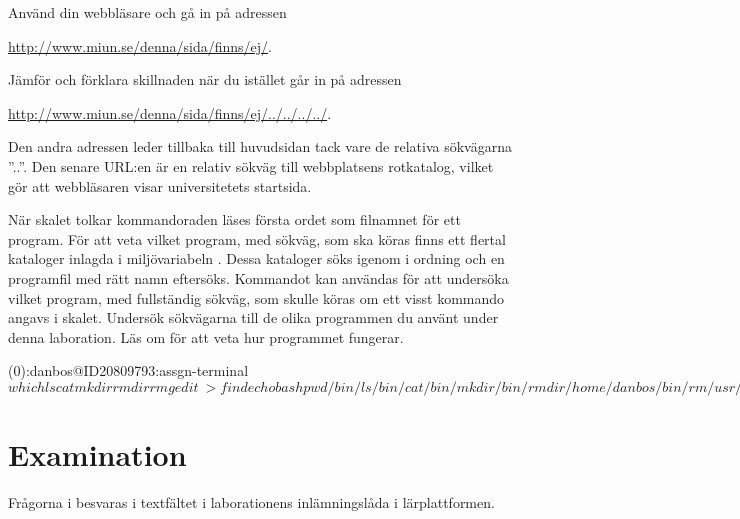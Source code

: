 \documentclass[a4paper,nocourse]{miunasgn}
\begin{document}
\begin{questions}
  \question\label{q:RelativeWWW}
  Använd din webbläsare och gå in på adressen
  \begin{center}
    \url{http://www.miun.se/denna/sida/finns/ej/}.
  \end{center}
  Jämför och förklara skillnaden när du istället går in på adressen
  \begin{center}
    \url{http://www.miun.se/denna/sida/finns/ej/../../../../}.
  \end{center}
  \begin{solution}
    Den andra adressen leder tillbaka till huvudsidan tack vare de relativa
    sökvägarna ''..''.
    Den senare URL:en är en relativ sökväg till webbplatsens rotkatalog, vilket 
    gör att webbläsaren visar universitetets startsida.
  \end{solution}

  \question\label{q:which}
  När skalet tolkar kommandoraden läses första ordet som filnamnet för ett 
  program.
  För att veta vilket program, med sökväg, som ska köras finns ett flertal 
  kataloger inlagda i miljövariabeln .
  Dessa kataloger söks igenom i ordning och en programfil med rätt namn 
  eftersöks.
  Kommandot  kan användas för att undersöka vilket program, med 
  fullständig sökväg, som skulle köras om ett visst kommando angavs i skalet.
  Undersök sökvägarna till de olika programmen du använt under denna 
  laboration.
  Läs om  för att veta hur programmet fungerar.
  \begin{solution}
    \begin{terminal}
(0):danbos@ID20809793:assgn-terminal$ which ls cat mkdir rmdir rm gedit \
> find echo bash pwd
/bin/ls
/bin/cat
/bin/mkdir
/bin/rmdir
/home/danbos/bin/rm
/usr/bin/gedit
/usr/bin/find
/bin/echo
/bin/bash
/bin/pwd
(0):danbos@ID20809793:assgn-terminal$
    \end{terminal}
  \end{solution}


\end{questions}


\section{Examination}
\label{sec:Examination}
\noindent
Frågorna i  besvaras i textfältet i laborationens 
inlämningslåda i lär\-platt\-formen.


\printbibliography
\end{document}
